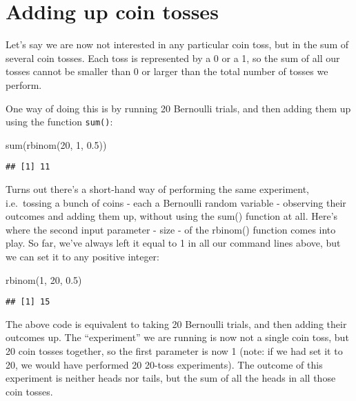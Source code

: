 \documentclass[
]{book}
\newenvironment{Shaded}{\begin{snugshade}}{\end{snugshade}}
\newcommand{\DecValTok}[1]{\textcolor[rgb]{0.00,0.00,0.81}{#1}}
\newcommand{\FloatTok}[1]{\textcolor[rgb]{0.00,0.00,0.81}{#1}}
\newcommand{\FunctionTok}[1]{\textcolor[rgb]{0.00,0.00,0.00}{#1}}
\newcommand{\NormalTok}[1]{#1}
\begin{document}
\hypertarget{adding-up-coin-tosses}{%
\section{Adding up coin tosses}\label{adding-up-coin-tosses}}

Let's say we are now not interested in any particular coin toss, but in the sum of several coin tosses. Each toss is represented by a 0 or a 1, so the sum of all our tosses cannot be smaller than 0 or larger than the total number of tosses we perform.

One way of doing this is by running 20 Bernoulli trials, and then adding them up using the function \texttt{sum()}:

\begin{Shaded}
\begin{Highlighting}[]
\FunctionTok{sum}\NormalTok{(}\FunctionTok{rbinom}\NormalTok{(}\DecValTok{20}\NormalTok{, }\DecValTok{1}\NormalTok{, }\FloatTok{0.5}\NormalTok{))}
\end{Highlighting}
\end{Shaded}

\begin{verbatim}
## [1] 11
\end{verbatim}

Turns out there's a short-hand way of performing the same experiment, i.e.~tossing a bunch of coins - each a Bernoulli random variable - observing their outcomes and adding them up, without using the sum() function at all. Here's where the second input parameter - size - of the rbinom() function comes into play. So far, we've always left it equal to 1 in all our command lines above, but we can set it to any positive integer:

\begin{Shaded}
\begin{Highlighting}[]
\FunctionTok{rbinom}\NormalTok{(}\DecValTok{1}\NormalTok{, }\DecValTok{20}\NormalTok{, }\FloatTok{0.5}\NormalTok{)}
\end{Highlighting}
\end{Shaded}

\begin{verbatim}
## [1] 15
\end{verbatim}

The above code is equivalent to taking 20 Bernoulli trials, and then adding their outcomes up. The ``experiment'' we are running is now not a single coin toss, but 20 coin tosses together, so the first parameter is now 1 (note: if we had set it to 20, we would have performed 20 20-toss experiments). The outcome of this experiment is neither heads nor tails, but the sum of all the heads in all those coin tosses.
\end{document}

